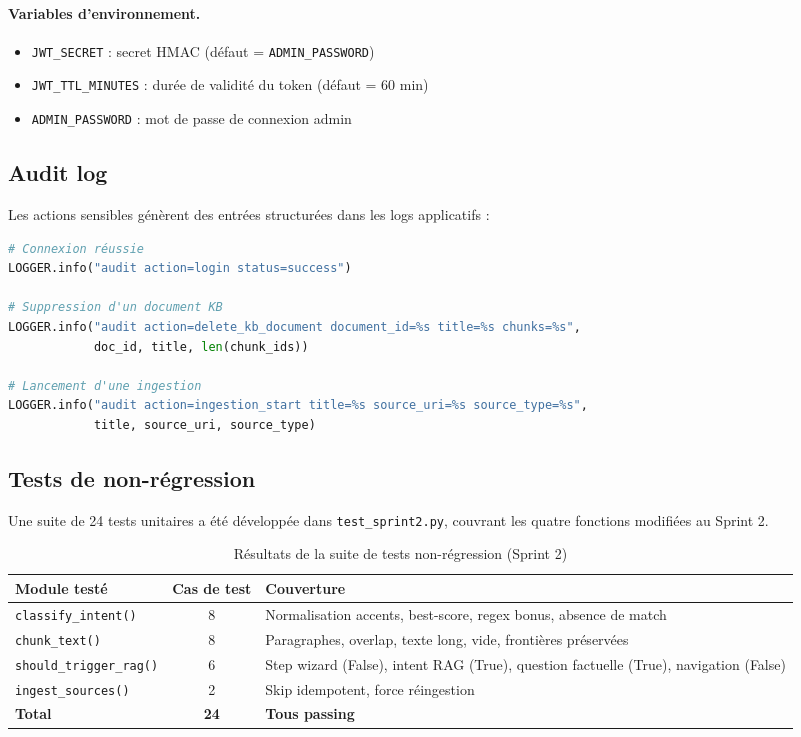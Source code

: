 \documentclass[12pt,a4paper]{report}
\begin{document}
\paragraph{Variables d'environnement.}
\begin{itemize}
  \item \texttt{JWT\_SECRET} : secret HMAC (défaut = \texttt{ADMIN\_PASSWORD})
  \item \texttt{JWT\_TTL\_MINUTES} : durée de validité du token (défaut = 60 min)
  \item \texttt{ADMIN\_PASSWORD} : mot de passe de connexion admin
\end{itemize}

\subsection{Audit log}

Les actions sensibles génèrent des entrées structurées dans les logs applicatifs :

\begin{lstlisting}[language=Python, caption={Exemples d'entrées d'audit log},
                   label={lst:audit}]
# Connexion réussie
LOGGER.info("audit action=login status=success")

# Suppression d'un document KB
LOGGER.info("audit action=delete_kb_document document_id=%s title=%s chunks=%s",
            doc_id, title, len(chunk_ids))

# Lancement d'une ingestion
LOGGER.info("audit action=ingestion_start title=%s source_uri=%s source_type=%s",
            title, source_uri, source_type)
\end{lstlisting}

\subsection{Tests de non-régression}

Une suite de 24 tests unitaires a été développée dans \texttt{test\_sprint2.py},
couvrant les quatre fonctions modifiées au Sprint 2.

\begin{table}[H]
\centering
\caption{Résultats de la suite de tests non-régression (Sprint 2)}
\small
\begin{tabularx}{\textwidth}{|l|c|X|}
\hline
\rowcolor{tableheader}
\textbf{Module testé} & \textbf{Cas de test} & \textbf{Couverture} \\
\hline
\texttt{classify\_intent()} & 8 & Normalisation accents, best-score, regex bonus, absence de match \\
\hline
\texttt{chunk\_text()} & 8 & Paragraphes, overlap, texte long, vide, frontières préservées \\
\hline
\texttt{should\_trigger\_rag()} & 6 & Step wizard (False), intent RAG (True), question factuelle (True), navigation (False) \\
\hline
\texttt{ingest\_sources()} & 2 & Skip idempotent, force réingestion \\
\hline
\textbf{Total} & \textbf{24} & \textbf{Tous passing} \\
\hline
\end{tabularx}
\label{tab:tests}
\end{table}
\end{document}
